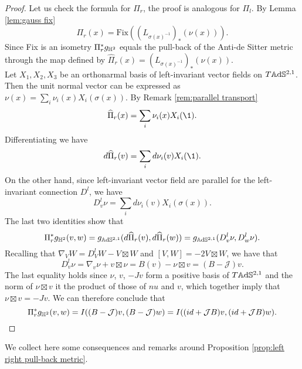 \begin{proof}
    Let us check the formula for $\Pi_r$, the proof is analogous for $\Pi_l$. By Lemma \ref{lem:gauss fix}
    \[
        \Pi_r(x) = \text{Fix}((L_{\sigma(x)^{-1}})_*(\nu(x))).
    \]
    Since Fix is an isometry $\Pi^*_r g_{\mathbb{H}^2}$ equals the pull-back of the Anti-de Sitter metric through the map defined by $\widehat{\Pi}_r(x) = (L_{\sigma(x)^{-1}})_*(\nu(x))$.\\
    Let $X_1, X_2, X_3$ be an orthonarmal basis of left-invariant vector fields on $T\mathbb{A}\mathrm{d}\mathbb{S}^{2,1}$. Then the unit normal vector can be expressed as $\nu(x) = \sum_i \nu_i(x) X_i (\sigma(x))$. By Remark \ref{rem:parallel transport}
    \[
        \widehat{\Pi}_r(x) = \sum_i \nu_i(x) X_i (\1).
    \]
    Differentiating we have
    \[
        d \widehat{\Pi}_r(v) = \sum_i  d \nu_i(v) X_i (\1).
    \]
    On the other hand, since left-invariant vector field are parallel for the left-invariant connection $D^l$, we have
    \[
        D^l_v \nu = \sum_i  d \nu_i(v) X_i (\sigma(x)).
    \]
    The last two identities show that
    \[
        \Pi_r^* g_{\mathbb{H}^2}(v,w) = g_{\mathbb{A}\mathrm{d}\mathbb{S}^{2,1}}(d \widehat{\Pi}_r(v),d \widehat{\Pi}_r(w)) = g_{\mathbb{A}\mathrm{d}\mathbb{S}^{2,1}} (D^l_v \nu, D^l_w \nu).
    \]
    Recalling that $\nabla_V W = D^l_V W - V \boxtimes W$ and $\left[ V,W \right] = -2 V \boxtimes W$, we have that
    \[
        D^l_v \nu = \nabla_v \nu + v \boxtimes \nu = B(v) - \nu \boxtimes v = (B- \mathcal{J})v.
    \]
    The last equality holds since $\nu$, $v$, $-Jv$ form a positive basis of $T\mathbb{A}\mathrm{d}\mathbb{S}^{2,1}$ and the norm of $\nu \boxtimes v$ it the product of those of $nu$ and $v$, which together imply that $\nu \boxtimes v = -Jv$.
    We can therefore conclude that
    \[
        \Pi_r^* g_{\mathbb{H}^2}(v,w) = I ((B - \mathcal{J})v, (B - \mathcal{J})w) = I((id + \mathcal{J}B)v, (id + \mathcal{J}B)w).
    \]
\end{proof}
We collect here some consequences and remarks around Proposition \ref{prop:left right pull-back metric}.
